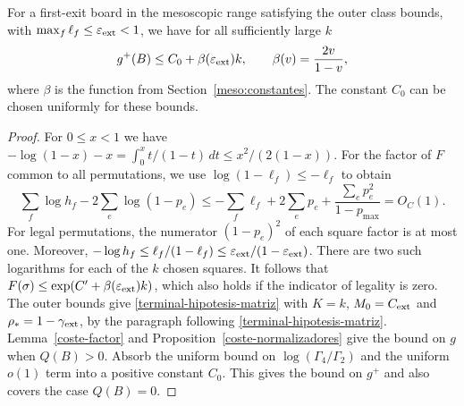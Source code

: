 \begin{corolario}\label{coste-debil}
For a first-exit board in the mesoscopic range satisfying the outer class bounds, with
$\max_f\ell_f\le\varepsilon_{\rm ext}<1$, we have for all sufficiently large $k$
\[
 g^+(B)\le C_0+\beta(\varepsilon_{\rm ext})k,\qquad
 \beta(v)=\frac{2v}{1-v},
\]
where $\beta$ is the function from Section~\ref{meso:constantes}. The constant $C_0$ can be
chosen uniformly for these bounds.
\end{corolario}
\begin{proof}
For $0\le x<1$ we have $-\log(1-x)-x=\int_0^x t/(1-t)\,dt\le x^2/(2(1-x))$. For the factor of
$F$ common to all permutations, we use $\log(1-\ell_f)\le-\ell_f$ to obtain
\[
 \sum_f\log h_f-2\sum_e\log(1-p_e)
 \le-\sum_f\ell_f+2\sum_ep_e+
       \frac{\sum_ep_e^2}{1-p_{\max}}
 =O_C(1).
\]
For legal permutations, the numerator $(1-p_e)^2$ of each square factor is at most one.
Moreover, $-\log h_f\le\ell_f/(1-\ell_f)\le\varepsilon_{\rm ext}/(1-\varepsilon_{\rm ext})$.
There are two such logarithms for each of the $k$ chosen squares. It follows that
$F(\sigma)\le\exp(C'+\beta(\varepsilon_{\rm ext})k)$, which also holds if the indicator of
legality is zero. The outer bounds give \eqref{terminal-hipotesis-matriz} with $K=k$,
$M_0=C_{\rm ext}$ and $\rho_*=1-\gamma_{\rm ext}$, by the paragraph following
\eqref{terminal-hipotesis-matriz}. Lemma~\ref{coste-factor} and
Proposition~\ref{coste-normalizadores} give the
bound on $g$ when $Q(B)>0$. Absorb the uniform bound on $\log(\Gamma_4/\Gamma_2)$ and the uniform
$o(1)$ term into a positive constant $C_0$. This gives the bound on $g^+$ and also covers
the case $Q(B)=0$.
\end{proof}

